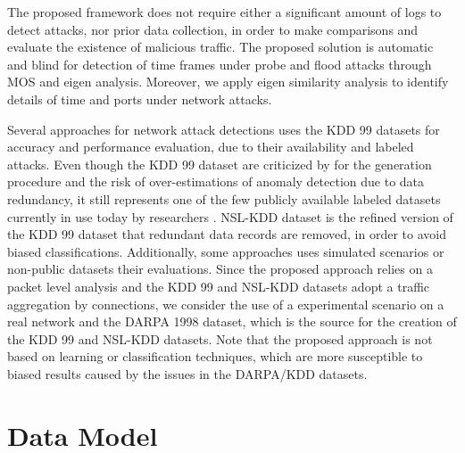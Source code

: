 The proposed framework does not require either a significant amount of logs to detect attacks, nor prior data collection, in order to make comparisons and evaluate the existence of malicious traffic. The proposed solution is automatic and blind for detection of time frames under probe and flood attacks through MOS and eigen analysis. Moreover, we apply eigen similarity analysis to identify details of time and ports under network attacks.

Several approaches for network attack detections uses the KDD 99 \cite{ji2016multi,ahmed2016survey,osanaiye2016distributed,bhuyan2014network} datasets for accuracy and performance evaluation, due to their availability and labeled attacks. Even though the KDD 99 dataset are criticized by for the generation procedure and the risk of over-estimations of anomaly detection due to data redundancy, it still represents one of the few publicly available labeled datasets currently in use today by researchers \cite{osanaiye2016distributed,bhuyan2014network}. NSL-KDD \cite{tavallaee2009detailed} dataset is the refined version of the KDD 99 dataset that redundant data records are removed, in order to avoid biased classifications. Additionally, some approaches uses simulated \cite{callegari2011novel} scenarios or non-public datasets their evaluations. Since the proposed approach relies on a packet level analysis and the KDD 99 and NSL-KDD datasets adopt a traffic aggregation by connections, we consider the use of a experimental scenario on a real network and the DARPA 1998 dataset, which is the source for the creation of the KDD 99 and NSL-KDD datasets. Note that the proposed approach is not based on learning or classification techniques, which are more susceptible to biased results caused by the issues in the DARPA/KDD datasets.


\section{Data Model}
\label{sec:2_datamodel}


